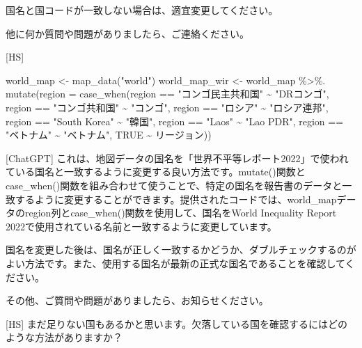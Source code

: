 \documentclass[
]{bxjsbook}
\newenvironment{Shaded}{\begin{snugshade}}{\end{snugshade}}
\newcommand{\AttributeTok}[1]{\textcolor[rgb]{0.77,0.63,0.00}{#1}}
\newcommand{\ConstantTok}[1]{\textcolor[rgb]{0.00,0.00,0.00}{#1}}
\newcommand{\FunctionTok}[1]{\textcolor[rgb]{0.00,0.00,0.00}{#1}}
\newcommand{\NormalTok}[1]{#1}
\newcommand{\OtherTok}[1]{\textcolor[rgb]{0.56,0.35,0.01}{#1}}
\newcommand{\SpecialCharTok}[1]{\textcolor[rgb]{0.00,0.00,0.00}{#1}}
\newcommand{\StringTok}[1]{\textcolor[rgb]{0.31,0.60,0.02}{#1}}
\theoremstyle{definition}
\theoremstyle{definition}
\theoremstyle{definition}
\theoremstyle{definition}
\theoremstyle{remark}
\begin{document}
国名と国コードが一致しない場合は、適宜変更してください。

他に何か質問や問題がありましたら、ご連絡ください。

{[}HS{]}

\begin{Shaded}
\begin{Highlighting}[]
\NormalTok{world\_map }\OtherTok{\textless{}{-}} \FunctionTok{map\_data}\NormalTok{(}\StringTok{"world"}\NormalTok{)}
\NormalTok{world\_map\_wir }\OtherTok{\textless{}{-}}\NormalTok{ world\_map }\SpecialCharTok{\%\textgreater{}\%}\NormalTok{. }
\FunctionTok{mutate}\NormalTok{(}\AttributeTok{region =} \FunctionTok{case\_when}\NormalTok{(region }\SpecialCharTok{==} \StringTok{"コンゴ民主共和国"} \SpecialCharTok{\textasciitilde{}} \StringTok{"DRコンゴ"}\NormalTok{,}
\NormalTok{region }\SpecialCharTok{==} \StringTok{"コンゴ共和国"} \SpecialCharTok{\textasciitilde{}} \StringTok{"コンゴ"}\NormalTok{,}
\NormalTok{region }\SpecialCharTok{==} \StringTok{"ロシア"} \SpecialCharTok{\textasciitilde{}} \StringTok{"ロシア連邦"}\NormalTok{,}
\NormalTok{region }\SpecialCharTok{==} \StringTok{"South Korea"} \SpecialCharTok{\textasciitilde{}} \StringTok{"韓国"}\NormalTok{,}
\NormalTok{region }\SpecialCharTok{==} \StringTok{"Laos"} \SpecialCharTok{\textasciitilde{}} \StringTok{"Lao PDR"}\NormalTok{,}
\NormalTok{region }\SpecialCharTok{==} \StringTok{"ベトナム"} \SpecialCharTok{\textasciitilde{}} \StringTok{"ベトナム"}\NormalTok{,}
\ConstantTok{TRUE} \SpecialCharTok{\textasciitilde{}}\NormalTok{ リージョン))}
\end{Highlighting}
\end{Shaded}

{[}ChatGPT{]} これは、地図データの国名を「世界不平等レポート2022」で使われている国名と一致するように変更する良い方法です。mutate()関数とcase\_when()関数を組み合わせて使うことで、特定の国名を報告書のデータと一致するように変更することができます。提供されたコードでは、world\_mapデータのregion列とcase\_when()関数を使用して、国名をWorld Inequality Report 2022で使用されている名前と一致するように変更しています。

国名を変更した後は、国名が正しく一致するかどうか、ダブルチェックするのがよい方法です。また、使用する国名が最新の正式な国名であることを確認してください。

その他、ご質問や問題がありましたら、お知らせください。

{[}HS{]} まだ足りない国もあるかと思います。欠落している国を確認するにはどのような方法がありますか？
\end{document}
